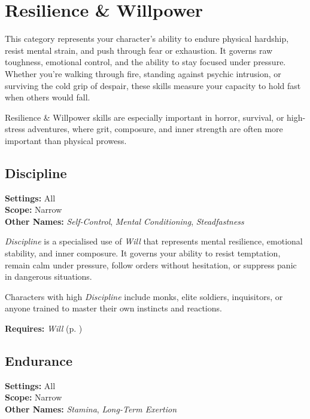 \section{Resilience \& Willpower}

This category represents your character’s ability to endure physical hardship, resist mental strain, and push through fear or exhaustion. It governs raw toughness, emotional control, and the ability to stay focused under pressure. Whether you're walking through fire, standing against psychic intrusion, or surviving the cold grip of despair, these skills measure your capacity to hold fast when others would fall.

Resilience \& Willpower skills are especially important in horror, survival, or high-stress adventures, where grit, composure, and inner strength are often more important than physical prowess.


\subsection{Discipline}\label{skill:discipline}
\textbf{Settings:} All\\
\textbf{Scope:} Narrow\\
\textbf{Other Names:} \emph{Self-Control}, \emph{Mental Conditioning}, \emph{Steadfastness}\\
\vspace{\baselineskip}

\emph{Discipline} is a specialised use of \emph{Will} that represents mental resilience, emotional stability, and inner composure. It governs your ability to resist temptation, remain calm under pressure, follow orders without hesitation, or suppress panic in dangerous situations.

Characters with high \emph{Discipline} include monks, elite soldiers, inquisitors, or anyone trained to master their own instincts and reactions.

\vspace{0.5\baselineskip}
\noindent\textbf{Requires:} \emph{Will} (p. \pageref{skill:will})


\subsection{Endurance}\label{skill:endurance}
\textbf{Settings:} All\\
\textbf{Scope:} Narrow\\
\textbf{Other Names:} \emph{Stamina}, \emph{Long-Term Exertion}\\
\vspace{\baselineskip}

